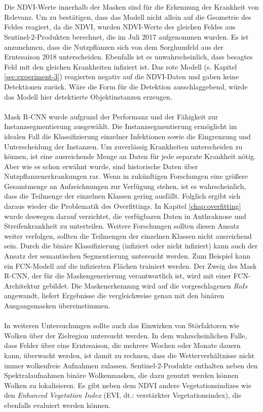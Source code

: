 \\\\
Die NDVI-Werte innerhalb der Masken sind für die Erkennung der Krankheit von Relevanz. Um zu bestätigen, dass das Modell nicht allein auf die Geometrie des Feldes reagiert, da die NDVI, wurden NDVI-Werte des gleichen Feldes aus Sentinel-2-Produkten berechnet, die im Juli 2017 aufgenommen wurden. Es ist anzunehmen, dass die Nutzpflanzen sich von dem Sorghumfeld aus der Erntesaison 2018 unterscheiden. Ebenfalls ist es unwahrscheinlich, dass besagtes Feld mit den gleichen Krankheiten infiziert ist. Das rote Modell (s. Kapitel \ref{sec:experiment-3}) reagierten negativ auf die NDVI-Daten und gaben keine Detektionen zurück. Wäre die Form für die Detektion ausschlaggebend, würde das Modell hier detektierte Objektinstanzen erzeugen.
\\\\
Mask R-CNN wurde aufgrund der Performanz und der Fähigkeit zur Instanzsegmentierung ausgewählt. Die Instanzsegmentierung ermöglicht im idealen Fall die Klassifizierung einzelner Infektionen sowie die Eingrenzung und Unterscheidung der Instanzen. Um zuverlässig Krankheiten unterscheiden zu können, ist eine ausreichende Menge an Daten für jede separate Krankheit nötig. Aber wie es schon erwähnt wurde, sind historische Daten über Nutzpflanzenerkrankungen rar. Wenn in zukünftigen Forschungen eine größere Gesamtmenge an Aufzeichnungen zur Verfügung stehen, ist es wahrscheinlich, dass die Teilmenge der einzelnen Klassen gering ausfällt. Folglich ergibt sich daraus wieder die Problematik des Overfittings. In Kapitel \ref{chap:overfitting} wurde deswegen darauf verzichtet, die verfügbaren Daten in Anthraknose und Streifenkrankheit zu unterteilen. Weitere Forschungen sollten diesen Ansatz weiter verfolgen, sollten die Teilmengen der einzelnen Klassen nicht ausreichend sein. Durch die binäre Klassifizierung (infiziert oder nicht infiziert) kann auch der Ansatz der semantischen Segmentierung untersucht werden. Zum Beispiel kann ein FCN-Modell auf die infizierten Flächen trainiert werden. Der Zweig des Mask R-CNN, der für die Maskengenerierung verantwortlich ist, wird mit einer FCN-Architektur gebildet. Die Maskenerkennung wird auf die vorgeschlagenen \textit{RoIs} angewandt, liefert Ergebnisse die vergleichweise genau mit den binären Ausgangsmasken übereinstimmen.
\\\\
In weiteren Untersuchungen sollte auch das Einwirken von Störfaktoren wie Wolken über der Zielregion untersucht werden. In dem wahrscheinlichen Falle, dass Felder über eine Erntesaison, die mehrere Wochen oder Monate dauern kann, überwacht werden, ist damit zu rechnen, dass die Wetterverhältnisse nicht immer wolkenfreie Aufnahmen zulassen. Sentinel-2-Produkte enthalten neben den Spektralaufnahmen binäre Wolkenmasken, die dazu genutzt werden können Wolken zu lokalisieren. Es gibt neben dem NDVI andere Vegetationsindizes wie den \textit{Enhanced Vegetation Index} (EVI, dt.: verstärkter Vegetationsindex), die ebenfalls evaluiert werden können.
\\\\
